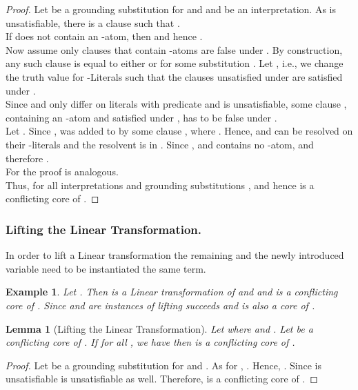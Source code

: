 \documentclass{llncs}
\newtheorem{lem}[theorem]{Lemma}
\newtheorem{exmp}{Example}
\begin{document}
\begin{proof}
Let   be a grounding substitution for  and  and  be an interpretation. 
As   is unsatisfiable, there is a clause  such that . \\
If  does not contain an -atom, then  and hence .\\
Now assume only clauses that contain -atoms are false under . 
By construction, any such clause is equal to either   or  for some substitution .
Let  , i.e.,
we change the truth value for -Literals such that the clauses unsatisfied under  are satisfied under .\\
Since   and  only differ on literals with predicate  and  is unsatisfiable, some clause , containing an -atom and satisfied under , has to be false under .\\
Let . Since ,  was added to  by some clause , where .
Hence,  and  can be resolved on their -literals and the resolvent  is in .
Since ,  and  contains no -atom,  and therefore .\\
For  the proof is analogous.\\
Thus, for all interpretations  and grounding substitutions ,  and hence  is a conflicting core of .
 \end{proof}

\subsubsection{Lifting the Linear Transformation.}
In order to lift a Linear transformation the remaining and the newly introduced variable  
need to be instantiated the same term. 

\begin{exmp}\label{liftLinEx}
Let  . 
Then   is a Linear transformation of  and
and     is a conflicting core of .
Since  and  are instances of  lifting succeeds and  is also a core of .
\end{exmp} 

\begin{lem}[Lifting the Linear Transformation]\label{liftlin}
Let  where  and .
Let  be a conflicting core of .
If for all ,  we have  then
 is a conflicting core of .
\end{lem}

\begin{proof}
Let  be a grounding substitution for  and . 
As  for , .
Hence, .
Since  is unsatisfiable  is unsatisfiable as well.
Therefore,   is a conflicting core of .
\end{proof}
\end{document}
